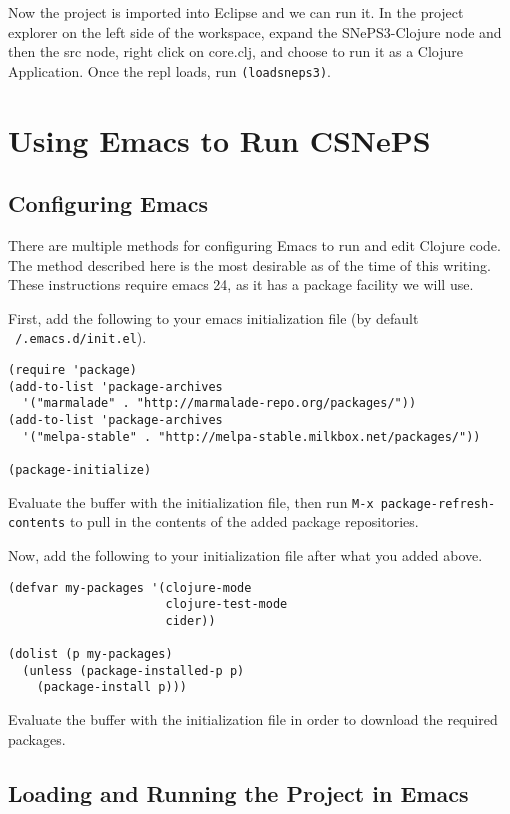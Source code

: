 \documentclass[letterpaper,colorlinks=true,linkcolor=blue]{book}
\begin{document}
Now the project is imported into Eclipse and we can run it. In the project explorer on the left side of the workspace, expand the SNePS3-Clojure node and then the src node, right click on core.clj, and choose to run it as a Clojure Application. Once the repl loads, run \texttt{(loadsneps3)}.

\section{Using Emacs to Run CSNePS}

\subsection{Configuring Emacs}

There are multiple methods for configuring Emacs to run and edit Clojure code. The method described here is the most desirable as of the time of this writing. These instructions require emacs 24, as it has a package facility we will use. 

First, add the following to your emacs initialization file (by default \texttt{~/.emacs.d/init.el}). 

\begin{verbatim}
(require 'package)
(add-to-list 'package-archives
  '("marmalade" . "http://marmalade-repo.org/packages/"))
(add-to-list 'package-archives
  '("melpa-stable" . "http://melpa-stable.milkbox.net/packages/"))

(package-initialize)
\end{verbatim}

Evaluate the buffer with the initialization file, then run \texttt{M-x package-refresh-contents} to pull in the contents of the added package repositories. 

Now, add the following to your initialization file after what you added above. 

\begin{verbatim}
(defvar my-packages '(clojure-mode
                      clojure-test-mode
                      cider))
                      
(dolist (p my-packages)
  (unless (package-installed-p p)
    (package-install p)))
\end{verbatim}

Evaluate the buffer with the initialization file in order to download the required packages. 

\subsection{Loading and Running the Project in Emacs}
\end{document}
